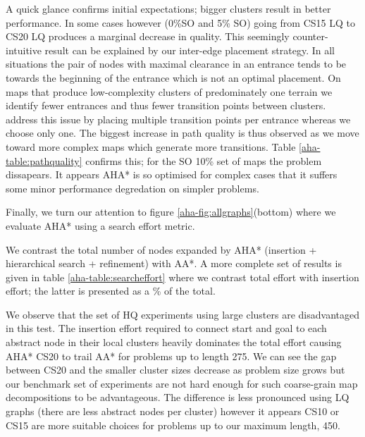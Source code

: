 
A quick glance confirms initial expectations; bigger clusters result in better performance. 
In some cases however (0\%SO and 5\% SO) going from CS15 LQ to CS20 LQ produces a marginal decrease in quality. 
This seemingly counter-intuitive result can be explained by our inter-edge placement strategy. 
In all situations the pair of nodes with maximal clearance in an entrance tends to be towards the beginning of the entrance which is not an optimal placement. 
On maps that produce low-complexity clusters of predominately one terrain we identify fewer entrances and thus fewer transition points between clusters. 
\cite{botea04} address this issue by placing multiple transition points per entrance whereas we choose only one. 
The biggest increase in path quality is thus observed as we move toward more complex maps which generate more transitions. 
Table \ref{aha-table:pathquality} confirms this; for the SO 10\% set of maps the problem dissapears. 
It appears AHA* is so optimised for complex cases that it suffers some minor performance degredation on simpler problems. 
\par \indent
Finally, we turn our attention to figure \ref{aha-fig:allgraphs}(bottom) where we evaluate AHA* using a search effort metric. 

We contrast the total number of nodes expanded by AHA* (insertion + hierarchical search + refinement) with AA*.
A more complete set of results is given in table \ref{aha-table:searcheffort} where we contrast total effort with insertion effort; the latter is presented as a \% of the total.
\par \indent
We observe that the set of HQ experiments using large clusters are disadvantaged in this test. 
The insertion effort required to connect start and goal to each abstract node in their local clusters heavily dominates the total effort causing AHA* CS20 to trail AA* for problems up to length 275.
We can see the gap between CS20 and the smaller cluster sizes decrease as problem size grows but our benchmark set of experiments are not hard enough for such coarse-grain map decompositions to be advantageous. 
The difference is less pronounced using LQ graphs (there are less abstract nodes per cluster) however it appears CS10 or CS15 are more suitable choices for problems up to our maximum length, 450.
